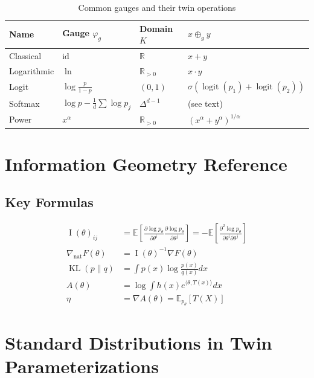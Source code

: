 \documentclass[11pt,twoside]{book}
\theoremstyle{plain}
\theoremstyle{definition}
\theoremstyle{remark}
\newcommand{\R}{\mathbb{R}}
\newcommand{\E}{\mathbb{E}}
\newcommand{\tplus}{\oplus_g}
\DeclareMathOperator{\KL}{KL}
\DeclareMathOperator{\Fisher}{I}
\DeclareMathOperator{\logit}{logit}
\newcommand{\pp}[2]{\frac{\partial #1}{\partial #2}}
\newcommand{\nabnat}{\nabla_{\mathrm{nat}}}
\newcommand{\simplex}{\Delta}
\newcommand{\Rpos}{\R_{>0}}
\begin{document}
\begin{table}[htbp]
    \centering
    \caption{Common gauges and their twin operations}
    \begin{tabular}{llll}
        \toprule
        \textbf{Name} & \textbf{Gauge $\varphi_g$} & \textbf{Domain $K$} & \textbf{$x \tplus y$} \\
        \midrule
        Classical & $\text{id}$ & $\R$ & $x + y$ \\
        Logarithmic & $\ln$ & $\Rpos$ & $x \cdot y$ \\
        Logit & $\log\frac{p}{1-p}$ & $(0,1)$ & $\sigma(\logit(p_1) + \logit(p_2))$ \\
        Softmax & $\log p - \frac{1}{d}\sum \log p_j$ & $\simplex^{d-1}$ & (see text) \\
        Power & $x^\alpha$ & $\Rpos$ & $(x^\alpha + y^\alpha)^{1/\alpha}$ \\
        \bottomrule
    \end{tabular}
\end{table}

\chapter{Information Geometry Reference}
\label{app:info_geom}

\section{Key Formulas}
\label{sec:info_formulas}

\begin{align}
    \Fisher(\theta)_{ij} &= \E\left[\pp{\log p_\theta}{\theta^i} \pp{\log p_\theta}{\theta^j}\right] = -\E\left[\frac{\partial^2 \log p_\theta}{\partial \theta^i \partial \theta^j}\right] \\
    \nabnat F(\theta) &= \Fisher(\theta)^{-1} \nabla F(\theta) \\
    \KL(p \| q) &= \int p(x) \log\frac{p(x)}{q(x)} dx \\
    A(\theta) &= \log \int h(x) e^{\langle \theta, T(x) \rangle} dx \\
    \eta &= \nabla A(\theta) = \E_{p_\theta}[T(X)]
\end{align}

\chapter{Standard Distributions in Twin Parameterizations}
\label{app:distributions}
\end{document}
